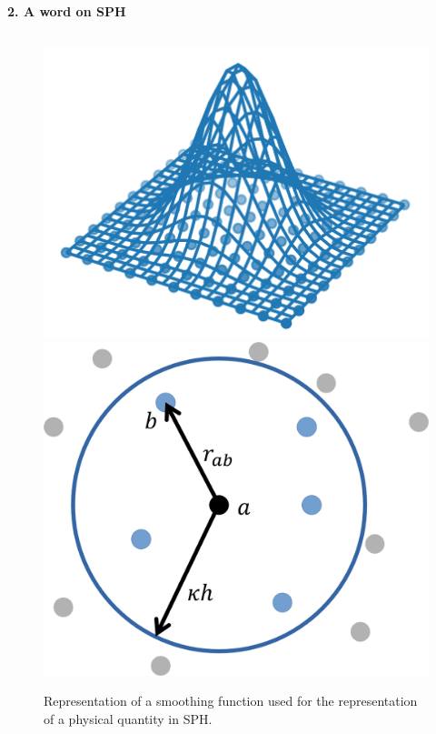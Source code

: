 \documentclass[final,t]{beamer}
\begin{document}
\begin{frame}
\begin{columns}[t]
\begin{column}{.495\linewidth}
\begin{block}{\textbf{2. A word on SPH}}
\begin{columns}
\begin{column}{0.29\textwidth}
  \vspace{-1cm}
  	\begin{figure}[!h]
  		\centering
  		\includegraphics[scale=0.8]{SPH_Kernel-3D.png} \\
  		\includegraphics[scale=0.8]{SPH_Kernel-2D.png} 
  		\caption{Representation of a smoothing function used for the representation of a physical quantity in SPH.}
  		\label{fig:Kernels-SPH}
  	\end{figure}
  \end{column}
  \end{columns}
  \end{block}
  
	\vspace{0.79cm}
	

\end{column}
\end{columns}
\end{frame}
\end{document}
